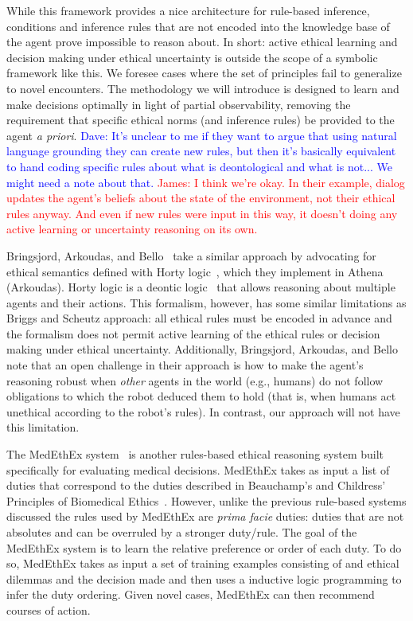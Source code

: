 \documentclass[11pt]{article}
\newcommand\davenote[1]{\textcolor{blue}{Dave: #1}}
\newcommand\jmnote[1]{\textcolor{red}{James: #1}}
\begin{document}
While this framework provides a nice architecture for rule-based inference, conditions and inference rules that are not encoded into the knowledge base of the agent prove impossible to reason about. In short: active ethical learning and decision making under ethical uncertainty is outside the scope of a symbolic framework like this. We foresee cases where the set of principles fail to generalize to novel encounters. The methodology we will introduce is designed to learn and make decisions optimally in light of partial observability, removing the requirement that specific ethical norms (and inference rules) be provided to the agent {\it a priori}. \davenote{It's unclear to me if they want to argue that using natural language grounding they can create new rules, but then it's basically equivalent to hand coding specific rules about what is deontological and what is not... We might need a note about that.} \jmnote{I think we're okay. In their example, dialog updates the agent's beliefs about the state of the environment, not their ethical rules anyway. And even if new rules were input in this way, it doesn't doing any active learning or uncertainty reasoning on its own.}

Bringsjord, Arkoudas, and Bello~ take a similar approach by advocating for ethical semantics defined with Horty logic~\cite{horty2001agency,murakami2004utilitarian}, which they implement in Athena (Arkoudas). Horty logic is a deontic logic~\cite{clarke1975logical} that allows reasoning about multiple agents and their actions. This formalism, however, has some similar limitations as Briggs and Scheutz approach: all ethical rules must be encoded in advance and the formalism does not permit active learning of the ethical rules or decision making under ethical uncertainty. Additionally, Bringsjord, Arkoudas, and Bello note that an open challenge in their approach is how to make the agent's reasoning robust when {\em other} agents in the world (e.g., humans) do not follow obligations to which the robot deduced them to hold (that is, when humans act unethical according to the robot's rules). In contrast, our approach will not have this limitation.

The MedEthEx system~\cite{anderson2006medethex} is another rules-based ethical reasoning system built specifically for evaluating medical decisions. MedEthEx takes as input a list of duties that correspond to the duties described in Beauchamp's and Childress' Principles of Biomedical Ethics~. However, unlike the previous rule-based systems discussed the rules used by MedEthEx are {\em prima facie} duties: duties that are not absolutes and can be overruled by a stronger duty/rule. The goal of the MedEthEx system is to learn the relative preference or order of each duty. To do so, MedEthEx takes as input a set of training examples consisting of and ethical dilemmas and the decision made and then uses a inductive logic programming to infer the duty ordering. Given novel cases, MedEthEx can then recommend courses of action.
\end{document}
